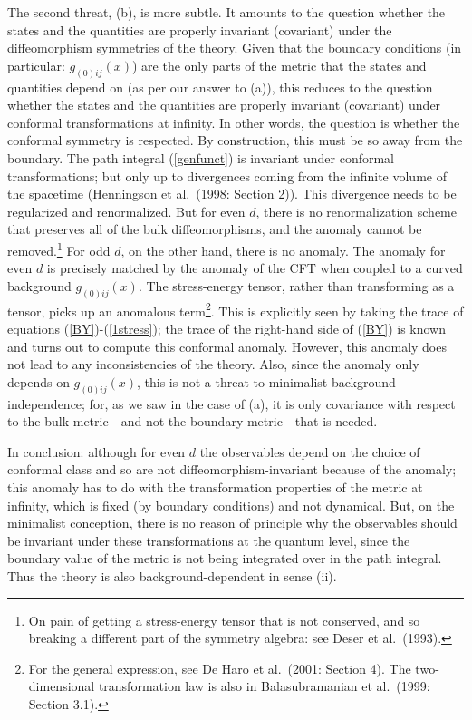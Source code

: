 \documentclass[12pt]{article}
\renewcommand{\^}[1]{\hat{#1}}
\newcommand{\eq}[1]{(\ref{#1})}
\begin{document}
The second threat, (b), is more subtle. It amounts to the question whether the states and the quantities are properly invariant (covariant) under the diffeomorphism symmetries of the theory. Given that the boundary conditions (in particular: $g_{(0)ij}(x)$) are the only parts of the metric that the states and quantities depend on (as per our answer to (a)), this reduces to the question  whether the states and the quantities are properly invariant (covariant) under conformal transformations at infinity. In other words, the question is whether the conformal symmetry is respected. By construction, this must be so away from the boundary. The path integral \eq{genfunct} is invariant under conformal transformations; but only up to divergences coming from the infinite volume of the spacetime (Henningson et al.~(1998: Section 2)). This divergence needs to be regularized and renormalized. But for even $d$, there is no renormalization scheme that preserves all of the bulk diffeomorphisms, and the anomaly cannot be removed.\footnote{On pain of getting a stress-energy tensor that is not conserved, and so breaking a different part of the symmetry algebra: see Deser et al.~(1993).} For odd $d$, on the other hand, there is no anomaly. The anomaly for even $d$ is precisely matched by the anomaly of the CFT when coupled to a curved background $g_{(0)ij}(x)$. The stress-energy tensor, rather than transforming as a tensor, picks up an anomalous term\footnote{For the general expression, see De Haro et al.~(2001:  Section 4). The two-dimensional transformation law is also in Balasubramanian et al.~(1999: Section 3.1).}. This is explicitly seen by taking the trace of equations \eq{BY}-\eq{1stress}; the trace of the right-hand side of \eq{BY} is known and turns out to compute this conformal anomaly. However, this anomaly  does not lead to any inconsistencies of the theory. Also, since the anomaly only depends on $g_{(0)ij}(x)$, this is not a threat to minimalist background-independence; for, as we saw in the case of (a), it is only covariance with respect to the bulk metric---and not the boundary metric---that is needed. 

In conclusion: although for even $d$ the observables depend on the choice of conformal class and so are not diffeomorphism-invariant because of the anomaly; this anomaly has to do with the transformation properties of the metric at infinity, which is fixed (by boundary conditions) and not dynamical. But, on the minimalist conception, there is no reason of principle why the observables should be invariant under these transformations at the quantum level, since the boundary value of the metric is not being integrated over in the path integral. Thus
the theory is also background-dependent in sense (ii).
\end{document}
